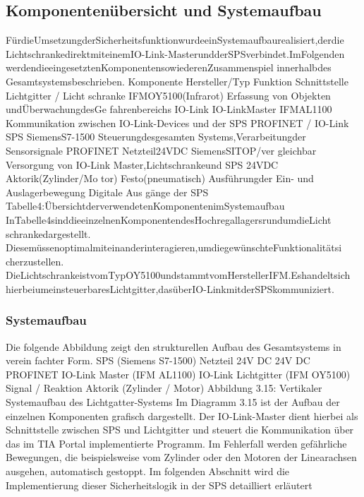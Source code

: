 \subsection{Komponentenübersicht und Systemaufbau}
FürdieUmsetzungderSicherheitsfunktionwurdeeinSystemaufbaurealisiert,derdie
LichtschrankedirektmiteinemIO-Link-MasterundderSPSverbindet.ImFolgenden
werdendieeingesetztenKomponentensowiederenZusammenspiel innerhalbdes
Gesamtsystemsbeschrieben.
Komponente Hersteller/Typ Funktion Schnittstelle
Lichtgitter / Licht
schranke
IFMOY5100(Infrarot) Erfassung von Objekten
undÜberwachungdesGe
fahrenbereichs
IO-Link
IO-LinkMaster IFMAL1100 Kommunikation zwischen
IO-Link-Devices und der
SPS
PROFINET /
IO-Link
SPS SiemensS7-1500 Steuerungdesgesamten
Systems,Verarbeitungder
Sensorsignale
PROFINET
Netzteil24VDC SiemensSITOP/ver
gleichbar
Versorgung von IO-Link
Master,Lichtschrankeund
SPS
24VDC
Aktorik(Zylinder/Mo
tor)
Festo(pneumatisch) Ausführungder Ein- und
Auslagerbewegung
Digitale Aus
gänge der
SPS
Tabelle4:ÜbersichtderverwendetenKomponentenimSystemaufbau
InTabelle4sinddieeinzelnenKomponentendesHochregallagersrundumdieLicht
schrankedargestellt.
Diesemüssenoptimalmiteinanderinteragieren,umdiegewünschteFunktionalitätsi
cherzustellen.
DieLichtschrankeistvomTypOY5100undstammtvomHerstellerIFM.Eshandeltsich
hierbeiumeinsteuerbaresLichtgitter,dasüberIO-LinkmitderSPSkommuniziert.

\subsubsection{Systemaufbau}
Die folgende Abbildung zeigt den strukturellen Aufbau des Gesamtsystems in verein
fachter Form.
SPS
(Siemens S7-1500)
Netzteil
24V DC
24V DC
PROFINET
IO-Link Master
(IFM AL1100)
IO-Link
Lichtgitter
(IFM OY5100)
Signal / Reaktion
Aktorik
(Zylinder / Motor)
Abbildung 3.15: Vertikaler Systemaufbau des Lichtgatter-Systems
Im Diagramm 3.15 ist der Aufbau der einzelnen Komponenten grafisch dargestellt. Der
IO-Link-Master dient hierbei als Schnittstelle zwischen SPS und Lichtgitter und steuert
die Kommunikation über das im TIA Portal implementierte Programm.
Im Fehlerfall werden gefährliche Bewegungen, die beispielsweise vom Zylinder oder
den Motoren der Linearachsen ausgehen, automatisch gestoppt.
Im folgenden Abschnitt wird die Implementierung dieser Sicherheitslogik in der SPS
detailliert erläutert

